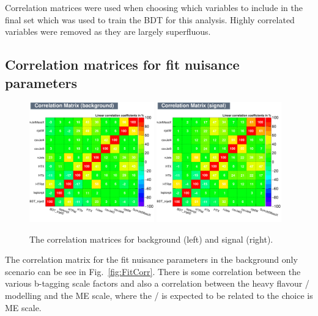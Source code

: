 Correlation matrices were used when choosing which variables to include in the final set which was used to train the BDT for this analysis. Highly correlated variables were removed as they are largely superfluous.

\subsection{Correlation matrices for fit nuisance parameters}


\begin{figure}[ht!]
    \includegraphics[width=0.48\textwidth]{images/Run2/CorrelationMatrixB.pdf}
    \includegraphics[width=0.48\textwidth]{images/Run2/CorrelationMatrixS.pdf}
    \caption{The correlation matrices for background (left) and signal (right).}
    \label{fig:corrMat}
\end{figure}

The correlation matrix for the fit nuisance parameters in the background only scenario can be see in Fig.~\ref{fig:FitCorr}. There is some correlation between the various b-tagging scale factors and also a correlation between the heavy flavour \heavyflavourone / \heavyflavourtwo modelling and the \ttbar ME scale, where the \heavyflavourone / \heavyflavourtwo is expected to be related to the choice is ME scale.

